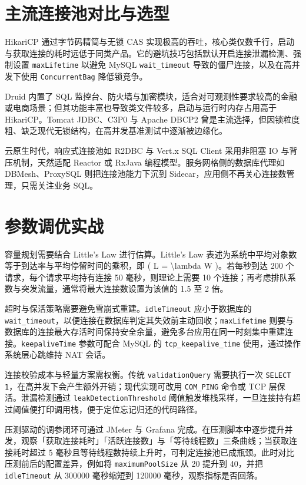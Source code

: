 \chapter{主流连接池对比与选型}
HikariCP 通过字节码精简与无锁 CAS 实现极高的吞吐，核心类仅数千行，启动与获取连接的耗时远低于同类产品。它的避坑技巧包括默认开启连接泄漏检测、强制设置 \texttt{maxLifetime} 以避免 MySQL \texttt{wait\_{}timeout} 导致的僵尸连接，以及在高并发下使用 \texttt{ConcurrentBag} 降低锁竞争。\par
Druid 内置了 SQL 监控台、防火墙与加密模块，适合对可观测性要求较高的金融或电商场景；但其功能丰富也导致类文件较多，启动与运行时内存占用高于 HikariCP。Tomcat JDBC、C3P0 与 Apache DBCP2 曾是主流选择，但因锁粒度粗、缺乏现代无锁结构，在高并发基准测试中逐渐被边缘化。\par
云原生时代，响应式连接池如 R2DBC 与 Vert.x SQL Client 采用非阻塞 IO 与背压机制，天然适配 Reactor 或 RxJava 编程模型。服务网格侧的数据库代理如 DBMesh、ProxySQL 则把连接池能力下沉到 Sidecar，应用侧不再关心连接数管理，只需关注业务 SQL。\par
\chapter{参数调优实战}
容量规划需要结合 Little’s Law 进行估算。Little’s Law 表述为系统中平均对象数等于到达率与平均停留时间的乘积，即 ( L = \textbackslash{}lambda W )。若每秒到达 200 个请求，每个请求平均持有连接 50 毫秒，则理论上需要 10 个连接；再考虑排队系数与突发流量，通常将最大连接数设置为该值的 1.5 至 2 倍。\par
超时与保活策略需要避免雪崩式重建。\texttt{idleTimeout} 应小于数据库的 \texttt{wait\_{}timeout}，以便连接在数据库判定其失效前主动回收；\texttt{maxLifetime} 则要与数据库的连接最大存活时间保持安全余量，避免多台应用在同一时刻集中重建连接。\texttt{keepaliveTime} 参数可配合 MySQL 的 \texttt{tcp\_{}keepalive\_{}time} 使用，通过操作系统层心跳维持 NAT 会话。\par
连接校验成本与轻量方案需权衡。传统 \texttt{validationQuery} 需要执行一次 \texttt{SELECT 1}，在高并发下会产生额外开销；现代实现可改用 \texttt{COM\_{}PING} 命令或 TCP 层保活。泄漏检测通过 \texttt{leakDetectionThreshold} 阈值触发堆栈采样，一旦连接持有超过阈值便打印调用栈，便于定位忘记归还的代码路径。\par
压测驱动的调参闭环可通过 JMeter 与 Grafana 完成。在压测脚本中逐步提升并发，观察「获取连接耗时」「活跃连接数」与「等待线程数」三条曲线；当获取连接耗时超过 5 毫秒且等待线程数持续上升时，可判定连接池已成瓶颈。此时对比压测前后的配置差异，例如将 \texttt{maximumPoolSize} 从 20 提升到 40，并把 \texttt{idleTimeout} 从 300000 毫秒缩短到 120000 毫秒，观察指标是否回落。\par

